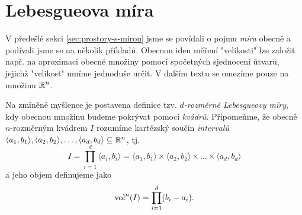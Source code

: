\section{Lebesgueova míra}\label{sec:lebesgueova-mira}

V předešlé sekci \ref{sec:prostory-s-mirou} jsme se povídali o pojmu \emph{míra} obecně a podívali jsme se na několik příkladů. Obecnou ideu měření "velikosti" lze založit např. na aproximaci obecné množiny pomocí spočetných sjednocení útvarů, jejichž "velikost" umíme jednoduše určit. V dalším textu se omezíme pouze na množinu $\mathbb{R}^n$.

Na zmíněné myšlence je postavena definice tzv. \emph{$d$-rozměrné Lebesgueovy míry}, kdy obecnou množinu budeme pokrývat pomocí \emph{kvádrů}. Připomeňme, že obecně $n$-rozměrným kvádrem $I$ rozumíme kartézský součin \emph{intervalů} $\langle a_1,b_1\rangle,\langle a_2,b_2\rangle,\ldots,\langle a_d,b_d\rangle\subseteq\mathbb{R}^n$, tj.
\[I=\prod_{i=1}^{d}\langle a_i,b_i\rangle=\langle a_1,b_1\rangle\times\langle a_2,b_2\rangle\times\dots\times\langle a_d,b_d\rangle\]
a jeho objem definujeme jako
\[\operatorname{vol}^n(I)=\prod_{i=1}^{d}(b_i-a_i).\]